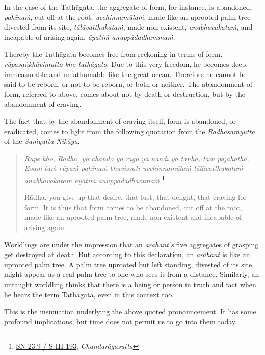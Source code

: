 In the case of the Tathāgata, the aggregate of form, for instance, is abandoned, \emph{pahīnaṁ}, cut off at the root, \emph{ucchinnamūlaṁ}, made like an uprooted palm tree divested from its site, \emph{tālāvatthukataṁ}, made non existent, \emph{anabhavakataṁ}, and incapable of arising again, \emph{āyatiṁ anuppādadhammaṁ}.

Thereby the Tathāgata becomes free from reckoning in terms of form, \emph{rūpasaṅkhāvimutto kho tathāgato}. Due to this very freedom, he becomes deep, immeasurable and unfathomable like the great ocean. Therefore he cannot be said to be reborn, or not to be reborn, or both or neither. The abandonment of form, referred to above, comes about not by death or destruction, but by the abandonment of craving.

The fact that by the abandonment of craving itself, form is abandoned, or eradicated, comes to light from the following quotation from the \emph{Rādhasaṁyutta} of the \emph{Saṁyutta Nikāya}.

\begin{quote}
\emph{Rūpe kho, Rādha, yo chando yo rāgo yā nandī yā taṇhā, taṁ pajahatha. Evaṁ taṁ rūpaṁ pahīnaṁ bhavissati ucchinnamūlaṁ tālāvatthukataṁ anabhāvakataṁ āyatiṁ anuppādadhammaṁ.}\footnote{\href{https://suttacentral.net/sn23.9/pli/ms}{SN 23.9 / S III 193}, \emph{Chandarāgasutta}}

Rādha, you give up that desire, that lust, that delight, that craving for form. It is thus that form comes to be abandoned, cut off at the root, made like an uprooted palm tree, made non-existent and incapable of arising again.
\end{quote}

Worldlings are under the impression that an \emph{arahant's} five aggregates of grasping get destroyed at death. But according to this declaration, an \emph{arahant} is like an uprooted palm tree. A palm tree uprooted but left standing, divested of its site, might appear as a real palm tree to one who sees it from a distance. Similarly, an untaught worldling thinks that there is a being or person in truth and fact when he hears the term Tathāgata, even in this context too.

This is the insinuation underlying the above quoted pronouncement. It has some profound implications, but time does not permit us to go into them today.
